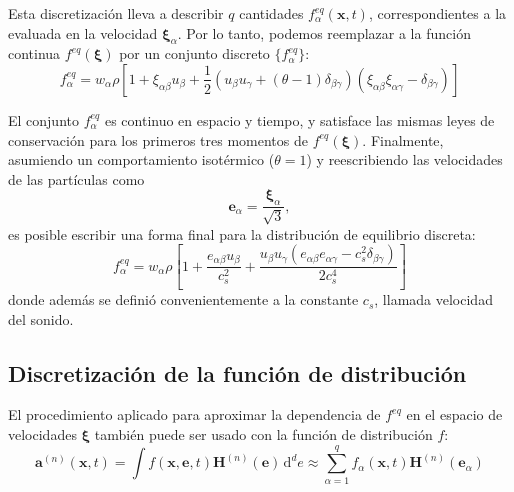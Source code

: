 Esta discretizaci\'on lleva a describir $q$ cantidades $f_{\alpha}^{eq}(\bm{x},t)$, correspondientes a la \edf{} evaluada en la velocidad $\bm{\xi}_{\alpha}$. Por lo tanto, podemos reemplazar a la funci\'on continua $f^{eq}(\bm{\xi})$ por un conjunto discreto $\{ f_{\alpha}^{eq} \}$:
\begin{equation}
	f_{\alpha}^{eq} = w_{\alpha} \rho \left[ 1 + \xi_{{\alpha}\beta}u_{\beta} + \dfrac{1}{2}\left( u_{\beta}u_{\gamma}+(\theta-1)\delta_{\beta\gamma} \right)\left(\xi_{{\alpha}\beta}\xi_{{\alpha}\gamma} - \delta_{\beta\gamma}\right) \right]
\end{equation}
\par
El conjunto ${f_{\alpha}^{eq}}$ es continuo en espacio y tiempo, y satisface las mismas leyes de conservaci\'on para los primeros tres momentos de $f^{eq}(\bm{\xi})$. Finalmente, asumiendo un comportamiento isot\'ermico ($\theta = 1$) y reescribiendo las velocidades de las part\'iculas como
\begin{equation}
	\bm{e}_{\alpha} = \dfrac{\bm{\xi}_{\alpha}}{\sqrt{3}},
\end{equation}
es posible escribir una forma final para la distribuci\'on de equilibrio discreta:
\begin{equation}
	f_{\alpha}^{eq} = w_{\alpha} \rho \left[ 1 + \dfrac{e_{\alpha \beta}u_{\beta}}{c_s^2} + \dfrac{u_{\beta}u_{\gamma}(e_{\alpha \beta}e_{{\alpha}\gamma}-c_s^2\delta_{\beta\gamma})}{2c_s^4} \right]
	\label{eq:feq}
\end{equation}
donde adem\'as se defini\'o convenientemente a la constante $c_s$, llamada velocidad del sonido.


\subsection{Discretizaci\'on de la funci\'on de distribuci\'on}
El procedimiento aplicado para aproximar la dependencia de $f^{eq}$ en el espacio de velocidades $\bm{\xi}$ tambi\'en puede ser usado con la funci\'on de distribuci\'on $f$:
\begin{equation}
	\bm{a}^{(n)}(\bm{x},t) = \int f(\bm{x}, \bm{e}, t) \bm{H}^{(n)}(\bm{e}) \, \mbox{d}^d e \approx \sum_{{\alpha}=1}^q f_{\alpha}(\bm{x},t)\bm{H}^{(n)}(\bm{e}_{\alpha})
\end{equation}

